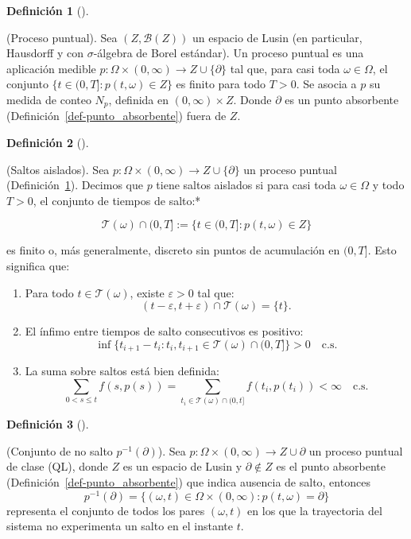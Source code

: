 \documentclass[
  spanish,
  us-letterpaper,
]{scrreprt}
\theoremstyle{plain}
\theoremstyle{plain}
\theoremstyle{definition}
\newtheorem{definition}{Definición}[chapter]
\theoremstyle{remark}
\begin{document}
\begin{definition}[]\protect\hypertarget{def-proceso_puntual}{}\label{def-proceso_puntual}

(Proceso puntual). Sea \((Z, \mathcal{B}(Z))\) un espacio de Lusin (en
particular, Hausdorff y con \(\sigma\)-álgebra de Borel estándar). Un
proceso puntual es una aplicación medible
\(p : \Omega \times (0,\infty) \to Z \cup \{\partial\}\) tal que, para
casi toda \(\omega \in \Omega\), el conjunto
\(\{ t \in (0,T] : p(t,\omega) \in Z \}\) es finito para todo \(T > 0\).
Se asocia a \(p\) su medida de conteo \(N_p\), definida en
\((0,\infty) \times Z\). Donde \(\partial\) es un punto absorbente
(Definición~\ref{def-punto_absorbente}) fuera de \(Z\).

\end{definition}

\begin{definition}[]\protect\hypertarget{def-saltos_aislados}{}\label{def-saltos_aislados}

(Saltos aislados). Sea
\(p: \Omega \times (0, \infty) \to Z \cup \{\partial\}\) un proceso
puntual (Definición~\ref{def-proceso_puntual}). Decimos que \(p\) tiene
saltos aislados si para casi toda \(\omega \in \Omega\) y todo
\(T > 0\), el conjunto de tiempos de salto:*

\[\mathcal{T}(\omega) \cap (0, T] := \{t \in (0, T] : p(t, \omega) \in Z\}\]

es finito o, más generalmente, discreto sin puntos de acumulación en
\((0, T]\). Esto significa que:

\begin{enumerate}
\def\labelenumi{\arabic{enumi}.}
\item
  Para todo \(t \in \mathcal{T}(\omega)\), existe \(\varepsilon > 0\)
  tal que:
  \[(t - \varepsilon, t + \varepsilon) \cap \mathcal{T}(\omega) = \{t\}.\]
\item
  El ínfimo entre tiempos de salto consecutivos es positivo:
  \[\inf\{t_{i+1} - t_i : t_i, t_{i+1} \in \mathcal{T}(\omega) \cap (0, T]\} > 0 \quad \text{c.s.}\]
\item
  La suma sobre saltos está bien definida:
  \[\sum_{0 < s \leq t} f(s, p(s)) = \sum_{t_i \in \mathcal{T}(\omega) \cap (0, t]} f(t_i, p(t_i)) < \infty \quad \text{c.s.}\]
\end{enumerate}

\end{definition}

\begin{definition}[]\protect\hypertarget{def-2}{}\label{def-2}

(Conjunto de no salto \(p^{-1}(\partial)\)). Sea
\(p : \Omega \times (0,\infty) \to Z \cup {\partial}\) un proceso
puntual de clase (QL), donde \(Z\) es un espacio de Lusin y
\(\partial \notin Z\) es el punto absorbente
(Definición~\ref{def-punto_absorbente}) que indica ausencia de salto,
entonces
\[p^{-1}(\partial) = \{ (\omega, t) \in \Omega \times (0,\infty) : p(t,\omega) = \partial \}\]
representa el conjunto de todos los pares \((\omega, t)\) en los que la
trayectoria del sistema no experimenta un salto en el instante \(t\).

\end{definition}
\end{document}

